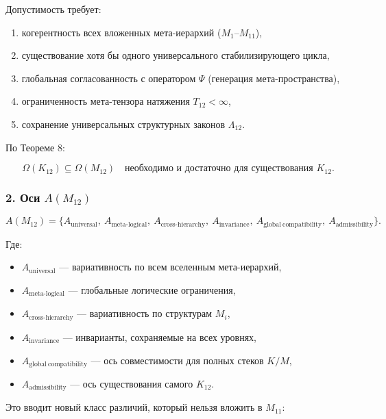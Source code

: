 Допустимость требует:

\begin{enumerate}
    \item когерентность всех вложенных мета-иерархий (\(M_1\)–\(M_{11}\)),
    \item существование хотя бы одного универсального стабилизирующего цикла,
    \item глобальная согласованность с оператором $\Psi$ (генерация мета-пространства),
    \item ограниченность мета-тензора натяжения $T_{12}<\infty$,
    \item сохранение универсальных структурных законов $\Lambda_{12}$.
\end{enumerate}

По Теореме 8:

\[
\Omega(K_{12}) \subseteq \Omega(M_{12})
\quad \text{необходимо и достаточно для существования }K_{12}.
\]

\subsubsection*{2. Оси $A(M_{12})$}

\[
A(M_{12}) =
\{
A_{\mathrm{universal}},\
A_{\mathrm{meta\mbox{-}logical}},\
A_{\mathrm{cross\mbox{-}hierarchy}},\
A_{\mathrm{invariance}},\
A_{\mathrm{global\ compatibility}},\
A_{\mathrm{admissibility}}
\}.
\]

Где:

\begin{itemize}
    \item $A_{\mathrm{universal}}$ — вариативность по всем вселенным мета-иерархий,
    \item $A_{\mathrm{meta\mbox{-}logical}}$ — глобальные логические ограничения,
    \item $A_{\mathrm{cross\mbox{-}hierarchy}}$ — вариативность по структурам $M_i$,
    \item $A_{\mathrm{invariance}}$ — инварианты, сохраняемые на всех уровнях,
    \item $A_{\mathrm{global\ compatibility}}$ — ось совместимости для полных стеков $K/M$,
    \item $A_{\mathrm{admissibility}}$ — ось существования самого $K_{12}$.
\end{itemize}

Это вводит новый класс различий, который нельзя вложить в $M_{11}$:

